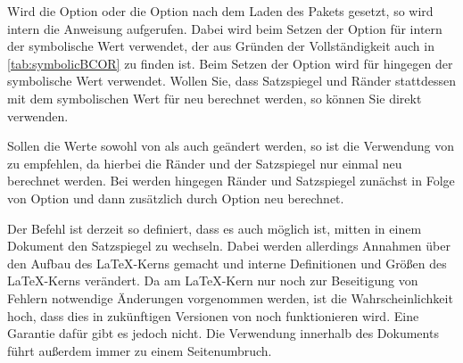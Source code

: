 \begin{Declaration}
\end{Declaration}%
\begin{Explain}
  Wird die Option  oder die Option
   nach dem Laden des Pakets
   gesetzt, so wird intern die Anweisung 
  aufgerufen. Dabei wird beim Setzen der Option
   für  intern der symbolische Wert
   verwendet, der aus Gründen der Vollständigkeit auch in
  \autoref{tab:symbolicBCOR} zu finden ist. Beim Setzen der Option
   wird für  hingegen der
  symbolische Wert  verwendet. Wollen Sie, dass Satzspiegel und
  Ränder stattdessen mit dem symbolischen Wert  für
   neu berechnet werden, so können Sie direkt
   verwenden.
\end{Explain}

\begin{table}
  \caption[{%
    Symbolische -Argumente für %
  }]{%
    Mögliche symbolische -Argumente für
  }
  \label{tab:symbolicBCOR}
  \begin{desctabular}
  \end{desctabular}
\end{table}

Sollen die Werte sowohl von  als auch  geändert werden,
so ist die Verwendung von  zu empfehlen, da hierbei die Ränder
und der Satzspiegel nur einmal neu berechnet werden. Bei
%
 werden hingegen Ränder und
Satzspiegel zunächst in Folge von Option  und
dann zusätzlich durch Option  neu berechnet.

\begin{Explain}
  Der Befehl  ist derzeit so definiert, dass es auch möglich
  ist, mitten in einem Dokument den Satzspiegel zu wechseln. Dabei werden
  allerdings Annahmen über den Aufbau des \LaTeX-Kerns gemacht und interne
  Definitionen und Größen des \LaTeX-Kerns verändert. Da am \LaTeX-Kern nur
  noch zur Beseitigung von Fehlern notwendige Änderungen vorgenommen werden,
  ist die Wahrscheinlichkeit hoch, dass dies in zukünftigen Versionen von
  \LaTeXe{} noch funktionieren wird. Eine Garantie dafür gibt es jedoch
  nicht. Die Verwendung innerhalb des Dokuments führt außerdem immer zu einem
  Seitenumbruch.
\end{Explain}

